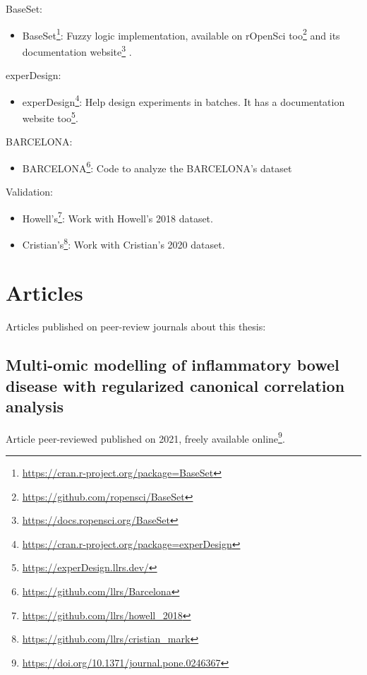 \documentclass[
  12pt,
  a4paper,
  twoside,
  openright]{book}
\DeclareRobustCommand{\href}[2]{#2\footnote{\url{#1}}}
\providecommand{\tightlist}{%
  \setlength{\itemsep}{0pt}\setlength{\parskip}{0pt}}
\begin{document}
BaseSet:

\begin{itemize}
\tightlist
\item
  \href{https://cran.r-project.org/package=BaseSet}{BaseSet}: Fuzzy logic implementation, available on \href{https://github.com/ropensci/BaseSet}{rOpenSci too} and its \href{https://docs.ropensci.org/BaseSet}{documentation website} .
\end{itemize}

experDesign:

\begin{itemize}
\tightlist
\item
  \href{https://cran.r-project.org/package=experDesign}{experDesign}: Help design experiments in batches. It has a \href{https://experDesign.llrs.dev/}{documentation website too}.
\end{itemize}

BARCELONA:

\begin{itemize}
\tightlist
\item
  \href{https://github.com/llrs/Barcelona}{BARCELONA}: Code to analyze the BARCELONA's dataset
\end{itemize}

Validation:

\begin{itemize}
\tightlist
\item
  \href{https://github.com/llrs/howell_2018}{Howell's}: Work with Howell's 2018 dataset.
\item
  \href{https://github.com/llrs/cristian_mark}{Cristian's}: Work with Cristian's 2020 dataset.
\end{itemize}

\hypertarget{articles}{%
\chapter{Articles}\label{articles}}

Articles published on peer-review journals about this thesis:

\hypertarget{app-multiomics}{%
\section{Multi-omic modelling of inflammatory bowel disease with regularized canonical correlation analysis}\label{app-multiomics}}


Article peer-reviewed published on 2021, freely \href{https://doi.org/10.1371/journal.pone.0246367}{available online}.
\end{document}
